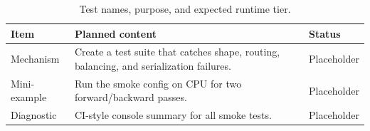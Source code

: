 \begin{table}[H]
\centering
\caption{Test names, purpose, and expected runtime tier.}
\label{tab:ch10-full-model-smoke-tests}
\begin{tabularx}{\textwidth}{p{}X p{}}
\toprule
Item & Planned content & Status \\
\midrule
Mechanism & Create a test suite that catches shape, routing, balancing, and serialization failures. & Placeholder \\
Mini-example & Run the smoke config on CPU for two forward/backward passes. & Placeholder \\
Diagnostic & CI-style console summary for all smoke tests. & Placeholder \\
\bottomrule
\end{tabularx}
\end{table}
